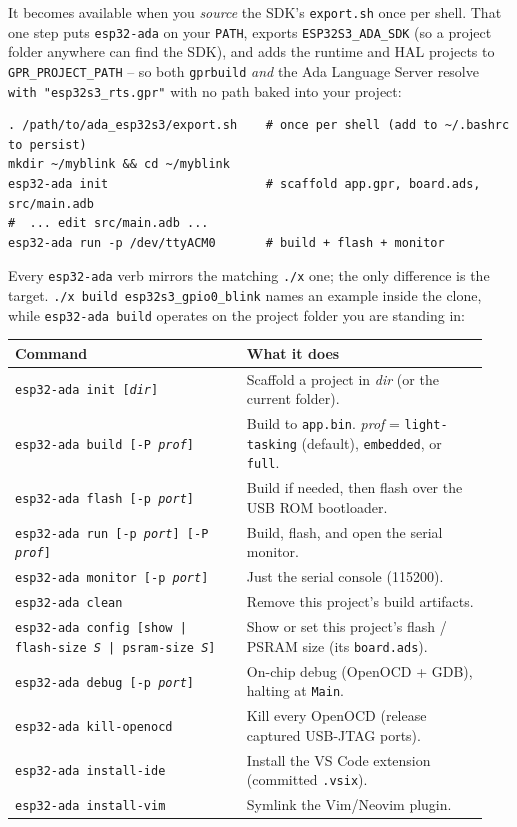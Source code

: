 It becomes available when you \emph{source} the SDK's \texttt{export.sh} once per
shell. That one step puts \texttt{esp32-ada} on your \texttt{PATH}, exports
\texttt{ESP32S3\_ADA\_SDK} (so a project folder anywhere can find the SDK), and
adds the runtime and HAL projects to \texttt{GPR\_PROJECT\_PATH} -- so both
\texttt{gprbuild} \emph{and} the Ada Language Server resolve
\texttt{with "esp32s3\_rts.gpr"} with no path baked into your project:

\begin{lstlisting}[style=sh]
. /path/to/ada_esp32s3/export.sh    # once per shell (add to ~/.bashrc to persist)
mkdir ~/myblink && cd ~/myblink
esp32-ada init                      # scaffold app.gpr, board.ads, src/main.adb
#  ... edit src/main.adb ...
esp32-ada run -p /dev/ttyACM0       # build + flash + monitor
\end{lstlisting}

Every \texttt{esp32-ada} verb mirrors the matching \texttt{./x} one; the only
difference is the target. \texttt{./x build esp32s3\_gpio0\_blink} names an example
inside the clone, while \texttt{esp32-ada build} operates on the project folder you
are standing in:

\begin{longtable}{p{0.46\linewidth} p{0.48\linewidth}}
\toprule
\textbf{Command} & \textbf{What it does} \\ \midrule
\endhead
\texttt{esp32-ada init [\textit{dir}]} & Scaffold a project in \textit{dir} (or the current folder). \\
\texttt{esp32-ada build [-P \textit{prof}]} & Build to \texttt{app.bin}. \textit{prof} = \texttt{light-tasking} (default), \texttt{embedded}, or \texttt{full}. \\
\texttt{esp32-ada flash [-p \textit{port}]} & Build if needed, then flash over the USB ROM bootloader. \\
\texttt{esp32-ada run [-p \textit{port}] [-P \textit{prof}]} & Build, flash, and open the serial monitor. \\
\texttt{esp32-ada monitor [-p \textit{port}]} & Just the serial console (115200). \\
\texttt{esp32-ada clean} & Remove this project's build artifacts. \\
\texttt{esp32-ada config [show | flash-size \textit{S} | psram-size \textit{S}]} & Show or set this project's flash / PSRAM size (its \texttt{board.ads}). \\
\texttt{esp32-ada debug [-p \textit{port}]} & On-chip debug (OpenOCD + GDB), halting at \texttt{Main}. \\
\texttt{esp32-ada kill-openocd} & Kill every OpenOCD (release captured USB-JTAG ports). \\
\texttt{esp32-ada install-ide} & Install the VS Code extension (committed \texttt{.vsix}). \\
\texttt{esp32-ada install-vim} & Symlink the Vim/Neovim plugin. \\ \midrule
\bottomrule
\end{longtable}

